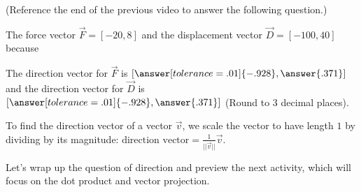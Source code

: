\documentclass{ximera}
\begin{document}
\begin{problem}
    (Reference the end of the previous video to answer the following question.)

    The force vector $\vec{F}=[-20,8]$ and the displacement vector $\vec{D}=[-100,40]$  because 

The direction vector for $\vec{F}$ is $[\answer[tolerance=.01]{-.928},\answer{.371}]$ and the direction vector for $\vec{D}$ is $[\answer[tolerance=.01]{-.928},\answer{.371}]$ (Round to 3 decimal places).

    \begin{feedback}
        To find the direction vector of a vector $\vec{v}$, we scale the vector to have length $1$ by dividing by its magnitude: $\text{direction vector}=\frac{1}{||\vec{v}||}\vec{v}$.
    \end{feedback}
\end{problem}

Let's wrap up the question of direction and preview the next activity, which will focus on the dot product and vector projection.

\end{document}
